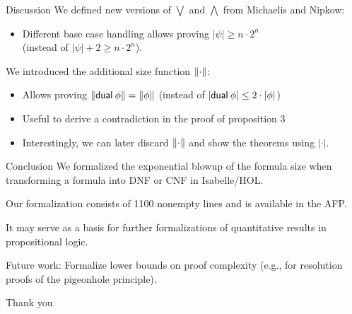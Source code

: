 \documentclass[aspectratio=169,11pt,usenames,dvipsnames]{beamer}
\begin{document}
\begin{frame}{Discussion}{}
  We defined new versions of $\bigvee$ and $\bigwedge$ from Michaelis and Nipkow:

  \begin{itemize}
  \item Different base case handling allows proving $\left|\psi\right| \ge n \cdot 2^n$ \\ (instead of $\left|\psi\right| + 2 \ge n \cdot 2^n$).
  \end{itemize}

  \pause
  \bigskip

  We introduced the additional size function $\left\|\cdot\right\|$:

  \begin{itemize}
  \item Allows proving $\left\|\mathsf{dual} \> \phi\right\| = \left\|\phi\right\|$ (instead of $\left|\mathsf{dual} \> \phi\right| \le 2 \cdot \left|\phi\right|$)
  \item Useful to derive a contradiction in the proof of proposition 3
  \item Interestingly, we can later discard $\left\|\cdot\right\|$ and show the theorems using $\left|\cdot\right|$.
  \end{itemize}
\end{frame}

\begin{frame}{Conclusion}{}
  We formalized the exponential blowup of the formula size when transforming a formula into DNF or CNF in Isabelle/HOL.

  \medskip
  
  Our formalization consists of 1100 nonempty lines and is available in the AFP.
  
  \pause
  \medskip

  It may serve as a basis for further formalizations of quantitative results in propositional logic.

  \medskip

  Future work: Formalize lower bounds on proof complexity (e.g., for resolution proofs of the pigeonhole principle).

  \pause
  \bigskip

  Thank you
\end{frame}

\end{document}
